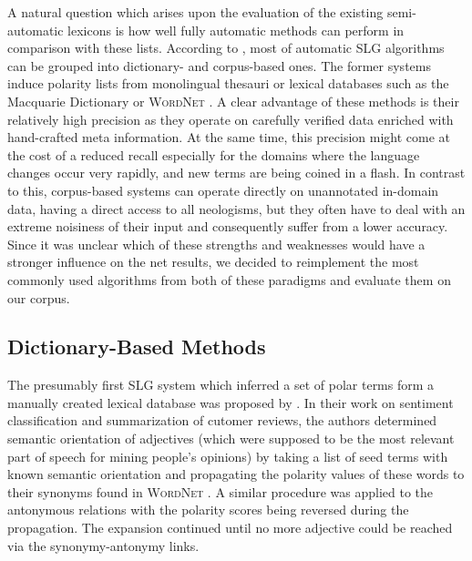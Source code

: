 A natural question which arises upon the evaluation of the existing
semi-automatic lexicons is how well fully automatic methods can
perform in comparison with these lists.  According to
\citet[p. 79]{Liu:12}, most of automatic SLG algorithms can be grouped
into dictionary- and corpus-based ones.  The former systems induce
polarity lists from monolingual thesauri or lexical databases such as
the Macquarie Dictionary \cite{Bernard:86} or \textsc{WordNet}
\cite{Miller:95}.  A clear advantage of these methods is their
relatively high precision as they operate on carefully verified data
enriched with hand-crafted meta information.  At the same time, this
precision might come at the cost of a reduced recall especially for
the domains where the language changes occur very rapidly, and new
terms are being coined in a flash.  In contrast to this, corpus-based
systems can operate directly on unannotated in-domain data, having a
direct access to all neologisms, but they often have to deal with an
extreme noisiness of their input and consequently suffer from a lower
accuracy.  Since it was unclear which of these strengths and
weaknesses would have a stronger influence on the net results, we
decided to reimplement the most commonly used algorithms from both of
these paradigms and evaluate them on our corpus.

\subsection{Dictionary-Based Methods}

The presumably first SLG system which inferred a set of polar terms
form a manually created lexical database was proposed by
\citet{Hu:04}.  In their work on sentiment classification and
summarization of cutomer reviews, the authors determined semantic
orientation of adjectives (which were supposed to be the most relevant
part of speech for mining people's opinions) by taking a list of seed
terms with known semantic orientation and propagating the polarity
values of these words to their synonyms found in \textsc{WordNet}
\cite{Miller:95}.  A similar procedure was applied to the antonymous
relations with the polarity scores being reversed during the
propagation.  The expansion continued until no more adjective could be
reached via the synonymy-antonymy links.

